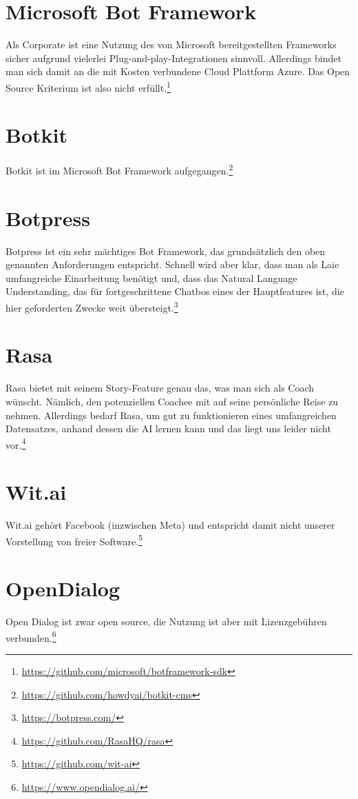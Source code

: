     
    \section{Microsoft Bot Framework} 
        Als Corporate ist eine Nutzung des von Microsoft bereitgestellten Frameworks sicher aufgrund vielerlei Plug-and-play-Integrationen sinnvoll. Allerdings bindet man sich damit an die mit Kosten verbundene Cloud Plattform Azure. Das Open Source Kriterium ist also nicht erfüllt.\footnote{\url{https://github.com/microsoft/botframework-sdk}}
        

    \section{Botkit} 
        Botkit ist im Microsoft Bot Framework aufgegangen.\footnote{\url{https://github.com/howdyai/botkit-cms}}
        

    \section{Botpress} 
        Botpress ist ein sehr mächtiges Bot Framework, das grundsätzlich den oben genannten Anforderungen entspricht. Schnell wird aber klar, dass man als Laie umfangreiche Einarbeitung benötigt und, dass das Natural Language Understanding, das für fortgeschrittene Chatbos eines der Hauptfeatures ist, die hier geforderten Zwecke weit übersteigt.\footnote{\url{https://botpress.com/}}
        

    \section{Rasa} 
        Rasa bietet mit seinem Story-Feature genau das, was man sich als Coach wünscht. Nämlich, den potenziellen Coachee mit auf seine persönliche Reise zu nehmen. Allerdings bedarf Rasa, um gut zu funktionieren eines umfangreichen Datensatzes, anhand dessen die AI lernen kann und das liegt uns leider nicht vor.\footnote{\url{https://github.com/RasaHQ/rasa}}
        

    \section{Wit.ai} 
        Wit.ai gehört Facebook (inzwischen Meta) und entspricht damit nicht unserer Vorstellung von freier Software.\footnote{\url{https://github.com/wit-ai}}
        

    \section{OpenDialog} 
        Open Dialog ist zwar open source, die Nutzung ist aber mit Lizenzgebühren verbunden.\footnote{\url{https://www.opendialog.ai/}}
        

